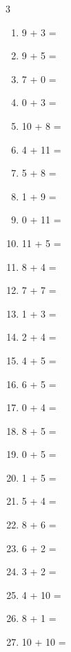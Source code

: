 \documentclass[a4paper, 11pt]{article}
\begin{document}
\begin{multicols}{3}
\begin{enumerate}
      \item 9 + 3 = \dotfill\bigskip
      \item 9 + 5 = \dotfill\bigskip
      \item 7 + 0 = \dotfill\bigskip
      \item 0 + 3 = \dotfill\bigskip
      \item 10 + 8 = \dotfill\bigskip
      \item 4 + 11 = \dotfill\bigskip
      \item 5 + 8 = \dotfill\bigskip
      \item 1 + 9 = \dotfill\bigskip
      \item 0 + 11 = \dotfill
      \item 11 + 5 = \dotfill\bigskip
      \item 8 + 4 = \dotfill\bigskip
      \item 7 + 7 = \dotfill\bigskip
      \item 1 + 3 = \dotfill\bigskip
      \item 2 + 4 = \dotfill\bigskip
      \item 4 + 5 = \dotfill\bigskip
      \item 6 + 5 = \dotfill\bigskip
      \item 0 + 4 = \dotfill\bigskip
      \item 8 + 5 = \dotfill\bigskip
      \item 0 + 5 = \dotfill\bigskip
      \item 1 + 5 = \dotfill\bigskip
      \item 5 + 4 = \dotfill\bigskip
      \item 8 + 6 = \dotfill\bigskip
      \item 6 + 2 = \dotfill\bigskip
      \item 3 + 2 = \dotfill\bigskip
      \item 4 + 10 = \dotfill\bigskip
      \item 8 + 1 = \dotfill\bigskip
      \item 10 + 10 = \dotfill
    \end{enumerate}
\end{multicols}
\end{document}
